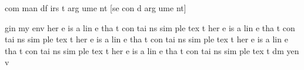 \my
com
man
d{f
		irs
		t
		arg
		ume
		nt}
	[se
		con
		d
		arg
		ume
		nt]

\be
gin
	{my
		env
	}
her
e
is
a
lin
e
tha
t
con
tai
ns
sim
ple
tex
t
her
e
is
a
lin
e
tha
t
con
tai
ns
sim
ple
tex
t
her
e
is
a
lin
e
tha
t
con
tai
ns
sim
ple
tex
t
her
e
is
a
lin
e
tha
t
con
tai
ns
sim
ple
tex
t
her
e
is
a
lin
e
tha
t
con
tai
ns
sim
ple
tex
t
\en
d{m
		yen
		v}

